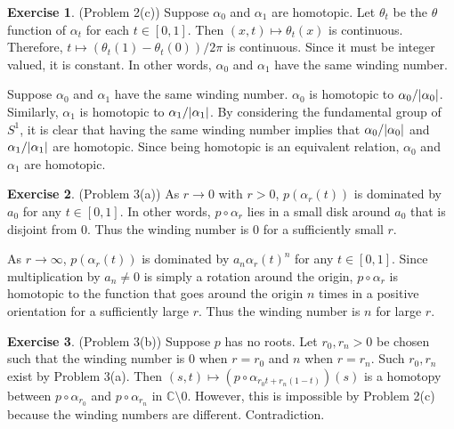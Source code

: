 \documentclass[12pt, psamsfonts]{amsart}
\theoremstyle{definition}
\newtheorem*{exer}{Exercise}
\theoremstyle{remark}
\numberwithin{equation}{section}
\begin{document}
\begin{exer}{(Problem 2(c))}
  Suppose $\alpha_0$ and $\alpha_1$ are homotopic.
  Let $\theta_t$ be the $\theta$ function of $\alpha_t$ for each $t \in [0, 1]$.
  Then $(x, t) \mapsto \theta_t(x)$ is continuous.
  Therefore, $t \mapsto (\theta_t(1) - \theta_t(0)) / 2\pi$ is continuous.
  Since it must be integer valued, it is constant.
  In other words, $\alpha_0$ and $\alpha_1$ have the same winding number.

  Suppose $\alpha_0$ and $\alpha_1$ have the same winding number.
  $\alpha_0$ is homotopic to $\alpha_0 / \abs{\alpha_0}$.
  Similarly, $\alpha_1$ is homotopic to $\alpha_1 / \abs{\alpha_1}$.
  By considering the fundamental group of $S^1$, it is clear that having the same winding number implies that $\alpha_0 / \abs{\alpha_0}$ and $\alpha_1 / \abs{\alpha_1}$ are homotopic.
  Since being homotopic is an equivalent relation, $\alpha_0$ and $\alpha_1$ are homotopic.
\end{exer}

\begin{exer}{(Problem 3(a))}
  As $r \rightarrow 0$ with $r > 0$, $p(\alpha_r(t))$ is dominated by $a_0$ for any $t \in [0, 1]$.
  In other words, $p \circ \alpha_r$ lies in a small disk around $a_0$ that is disjoint from 0.
  Thus the winding number is 0 for a sufficiently small $r$.

  As $r \rightarrow \infty$, $p(\alpha_r(t))$ is dominated by $a_n\alpha_r(t)^n$ for any $t \in [0, 1]$.
  Since multiplication by $a_n \ne 0$ is simply a rotation around the origin, $p \circ \alpha_r$ is homotopic to the function that goes around the origin $n$ times in a positive orientation for a sufficiently large $r$.
  Thus the winding number is $n$ for large $r$.
\end{exer}

\begin{exer}{(Problem 3(b))}
  Suppose $p$ has no roots.
  Let $r_0, r_n > 0$ be chosen such that the winding number is 0 when $r = r_0$ and $n$ when $r = r_n$.
  Such $r_0, r_n$ exist by Problem 3(a).
  Then $(s, t) \mapsto (p \circ \alpha_{r_0t + r_n(1 - t)})(s)$ is a homotopy between $p \circ \alpha_{r_0}$ and $p \circ \alpha_{r_n}$ in $\mathbb{C} \setminus 0$.
  However, this is impossible by Problem 2(c) because the winding numbers are different.
  Contradiction.
\end{exer}
\end{document}
